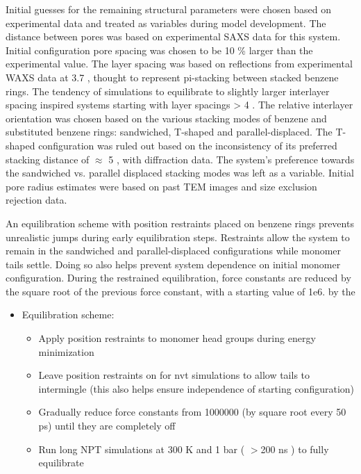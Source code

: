 Initial guesses for the remaining structural parameters were chosen
based on experimental data and treated as variables during model
development. The distance between pores was based on experimental SAXS
data for this system. Initial configuration pore spacing was chosen to
be 10 \% larger than the experimental value. The layer spacing was based
on reflections from experimental WAXS data at 3.7 \angstrom, thought to
represent pi-stacking between stacked benzene rings. The tendency of 
simulations to equilibrate to slightly larger interlayer spacing 
inspired systems starting with layer spacings > 4 \angstrom.
The relative interlayer orientation was chosen based on the various 
stacking modes of benzene and substituted benzene rings: sandwiched,
T-shaped and parallel-displaced. The T-shaped configuration was ruled
out based on the inconsistency of its preferred stacking distance of 
$\approx$ 5 \angstrom, with diffraction data. The system's preference
towards the sandwiched vs. parallel displaced stacking modes was left
as a variable. Initial pore radius estimates were based on past TEM 
images and size exclusion rejection data.    

An equilibration scheme with position restraints placed on benzene rings
prevents unrealistic jumps during early equilibration steps. Restraints
allow the system to remain in the sandwiched and parallel-displaced 
configurations while monomer tails settle. Doing so also helps prevent
system dependence on initial monomer configuration. During the restrained
equilibration, force constants are reduced by the square root of the 
previous force constant, with a starting value of 1e6.  by the
\begin{itemize}
	\item Equilibration scheme:
	\begin{itemize}
		\item Apply position restraints to monomer head groups during energy minimization 
		\item Leave position restraints on for nvt simulations to allow tails to intermingle (this also helps ensure independence of starting configuration)
		\item Gradually reduce force constants from 1000000 (by square root every 50 ps) until they are completely off
		\item Run long NPT simulations at 300 K and 1 bar ( $>$200 ns ) to fully equilibrate 
	\end{itemize}
\end{itemize}

